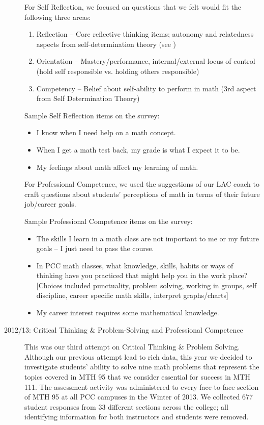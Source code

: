 \begin{description}
For Self Reflection, we focused on questions that we felt would fit the following three areas:
\begin{enumerate}
\item Reflection -- Core reflective thinking items; autonomy and relatedness aspects from self-determination theory (see \cite{selfdetermination})
\item Orientation -- Mastery/performance, internal/external locus of control (hold self responsible vs. holding others responsible)
\item Competency -- Belief about self-ability to perform in math (3rd aspect from Self Determination Theory) 
\end{enumerate}
Sample Self Reflection items on the survey:
\begin{itemize}
\item I know when I need help on a math concept.
\item When I get a math test back, my grade is what I expect it to be.
\item My feelings about math affect my learning of math.
\end{itemize}

For Professional Competence, we used the suggestions of our LAC coach to craft questions about students' perceptions of math in terms of their future job/career goals. 

Sample Professional Competence items on the survey:
\begin{itemize}
\item The skills I learn in a math class are not important to me or my future goals -- I just need to pass the course.
\item In PCC math classes, what knowledge, skills, habits or ways of thinking have you practiced that might help you in the work place? [Choices included punctuality, problem solving, working in groups, self discipline, career specific math skills, interpret graphs/charts]
\item My career interest requires some mathematical knowledge.
\end{itemize}

\item[2012/13:  Critical Thinking \& Problem-Solving and Professional Competence]

This was our third attempt on Critical Thinking \& Problem Solving.  Although our previous attempt lead to rich data, this year we decided to investigate students' ability to solve nine math problems that represent the topics covered in MTH 95 that we consider essential for success in MTH 111.  The assessment activity was administered to every face-to-face section of MTH 95 at all PCC campuses in the Winter of 2013.  We collected 677 student responses from 33 different sections across the college; all identifying information for both instructors and students were removed.


\end{description}
